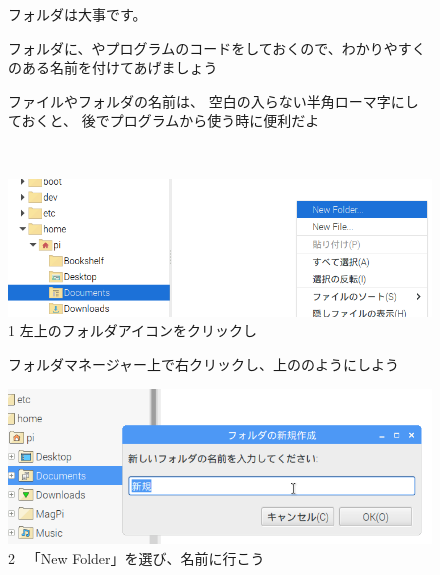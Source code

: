 \documentclass[a4paper,12pt]{jarticle}
\begin{document}
\begin{figure}[hb]
  \centering
  \begin{minipage}{0.9\textwidth}
    {	\large
      フォルダは大事です。

      フォルダに、やプログラムのコードをしておくので、わかりやすくのある名前を付けてあげましょう

      \bigskip
      ファイルやフォルダの名前は、
      空白の入らない半角ローマ字にしておくと、
      後でプログラムから使う時に便利だよ
    }
  \end{minipage}
\end{figure}
\clearpage
\begin{figure}[ht]
  \vspace{8mm}\\
  \centering
  \begin{minipage}{0.8\textwidth}
   \includegraphics[width=\linewidth]{textbook-img034.png}
    1
    左上のフォルダアイコンをクリックし

    フォルダマネージャー上で右クリックし、上ののようにしよう
  \end{minipage}
  \vspace{\baselineskip}

  \centering
  \begin{minipage}{0.8\textwidth}
   \includegraphics[width=\linewidth]{textbook-img036.png}
    2
    \ 「New Folder」を選び、名前に行こう
  \end{minipage}
  \vspace{\baselineskip}


\end{figure}
\end{document}
